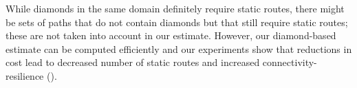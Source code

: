 While diamonds in the same domain definitely require 
static routes, there might be
sets of paths that do not contain 
diamonds but that still require static routes;
these are not
taken into account in our estimate. 
However, our diamond-based estimate
can be computed efficiently and 
our experiments show that reductions 
in cost lead to decreased number of static routes
and increased connectivity-resilience ().


